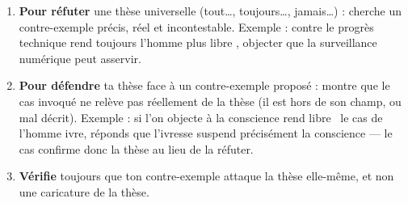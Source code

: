 \documentclass[11pt]{article}
\begin{document}
\begin{methode}
\begin{enumerate}
\item \textbf{Pour réfuter} une thèse universelle (\guillemotleft tout\ldots \guillemotright, \guillemotleft toujours\ldots \guillemotright, \guillemotleft jamais\ldots \guillemotright) : cherche un contre-exemple précis, réel et incontestable. Exemple : contre \guillemotleft le progrès technique rend toujours l'homme plus libre \guillemotright, objecter que la surveillance numérique peut asservir.
\item \textbf{Pour défendre} ta thèse face à un contre-exemple proposé : montre que le cas invoqué ne relève pas réellement de la thèse (il est hors de son champ, ou mal décrit). Exemple : si l'on objecte à \guillemotleft la conscience rend libre \guillemotright\ le cas de l'homme ivre, réponds que l'ivresse suspend précisément la conscience — le cas confirme donc la thèse au lieu de la réfuter.
\item \textbf{Vérifie} toujours que ton contre-exemple attaque la thèse elle-même, et non une caricature de la thèse.
\end{enumerate}
\end{methode}
\end{document}
